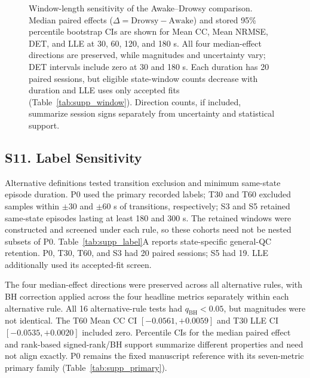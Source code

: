 \begin{figure}[p]
\centering
{}
\caption{Window-length sensitivity of the Awake--Drowsy comparison. Median paired effects ($\Delta=\mathrm{Drowsy}-\mathrm{Awake}$) and stored 95\% percentile bootstrap CIs are shown for Mean CC, Mean NRMSE, DET, and LLE at 30, 60, 120, and 180 s. All four median-effect directions are preserved, while magnitudes and uncertainty vary; DET intervals include zero at 30 and 180 s. Each duration has 20 paired sessions, but eligible state-window counts decrease with duration and LLE uses only accepted fits (Table~\ref{tab:supp_window}). Direction counts, if included, summarize session signs separately from uncertainty and statistical support.}
\label{fig:supp_window}
\end{figure}
\subsection*{S11. Label Sensitivity}
Alternative definitions tested transition exclusion and minimum same-state episode duration. P0 used the primary recorded labels; T30 and T60 excluded samples within $\pm$30 and $\pm$60 s of transitions, respectively; S3 and S5 retained same-state episodes lasting at least 180 and 300 s. The retained windows were constructed and screened under each rule, so these cohorts need not be nested subsets of P0. Table~\ref{tab:supp_label}A reports state-specific general-QC retention. P0, T30, T60, and S3 had 20 paired sessions; S5 had 19. LLE additionally used its accepted-fit screen.

The four median-effect directions were preserved across all alternative rules, with BH correction applied across the four headline metrics separately within each alternative rule. All 16 alternative-rule tests had $q_{\mathrm{BH}}<0.05$, but magnitudes were not identical. The T60 Mean CC CI $[-0.0561,+0.0059]$ and T30 LLE CI $[-0.0535,+0.0020]$ included zero. Percentile CIs for the median paired effect and rank-based signed-rank/BH support summarize different properties and need not align exactly. P0 remains the fixed manuscript reference with its seven-metric primary family (Table~\ref{tab:supp_primary}).

